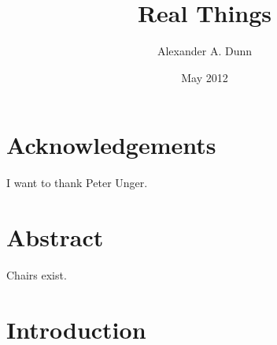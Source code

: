\documentclass[12pt,twoside]{reedfancy}
\title{Real Things}
\author{Alexander A. Dunn}
\date{May 2012}
\newenvironment{epigram}{%
	\begin{minipage}[c]{0.75\textwidth}
	\vspace{2.5in}
	\begin{spacing}{1}
	\begin{list}{}{%
	\setlength{\labelwidth}{0pt}
	\setlength{\leftmargin}{1.4in}
	\setlength{\rightmargin}{.25in}}
	\item[]
	}{%
	\end{list}
	\end{spacing}
	\end{minipage}
	\newline
	}
\begin{document}
  \maketitle
  \frontmatter %
  \pagestyle{empty} %


\begin{spacing}{1.25}

    \chapter*{Acknowledgements}
	I want to thank Peter Unger.


    \tableofcontents

\chapter*{Abstract}
Chairs exist.

	\mainmatter %
	\pagestyle{fancyplain} %
  
\chapter{Introduction}




\end{spacing}
\end{document}
